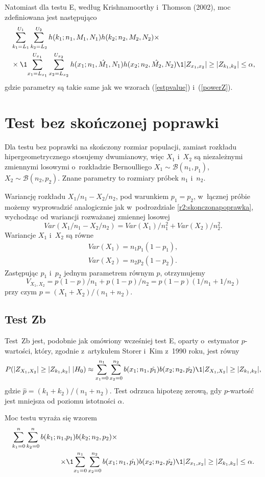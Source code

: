 Natomiast dla testu E, według Krishnamoorthy i~Thomson (2002), moc zdefiniowana jest następująco \cite{K.Krishnamoorthy2002}
\begin{equation}
\begin{split}
&\sum_{k_1=L_1}^{U_1}\sum_{k_2=L_2}^{U_2} h(k_1;n_1,M_1,N_1)h(k_2;n_2,M_2,N_2) \times \\
&\times \1{\sum_{x_1=L_{x_1}}^{U_{x_1}}\sum_{x_2=L_{x_2}}^{U_{x_2}} h(x_1;n_1,\hat{M_1},N_1)h(x_2;n_2,\hat{M_2},N_2) \1{|Z_{x_1,x_2}|\geq|Z_{k_1,k_2}|}\leq\alpha },
\end{split}
\end{equation}
gdzie parametry są takie same jak we wzorach (\ref{estpvalue}) i~(\ref{powerZ}).

\section{Test bez skończonej poprawki}
Dla testu bez poprawki na skończony rozmiar populacji, zamiast rozkładu hipergeometrycznego stosujemy dwumianowy, więc $X_1$ i~$X_2$ są niezależnymi zmiennymi losowymi o~rozkładzie Bernoulliego $X_1\sim \mathcal{B}(n_1,p_1)$, $X_2\sim \mathcal{B}(n_2,p_2)$. Znane parametry to rozmiary próbek $n_1$ i~$n_2$.

Wariancję rozkładu $X_1/n_1-X_2/n_2$, pod warunkiem $p_1=p_2$, w~łącznej próbie możemy wyprowadzić analogicznie jak w~podrozdziale \ref{r2:skonczonapoprawka}, wychodząc od wariancji rozważanej zmiennej losowej
\begin{equation}
Var(X_1/n_1-X_2/n_2) = Var(X_1)/n_1^2+Var(X_2)/n_2^2.
\end{equation}
Wariancje $X_1$ i~$X_2$ są równe
\begin{align}
Var(X_1)=n_1 p_1 (1-p_1),\\
Var(X_2)=n_2 p_2 (1-p_2).
\end{align}
Zastępując $p_1$ i~$p_2$ jednym parametrem równym $p$, otrzymujemy
\begin{equation}
V_{X_1,X_2} = p(1-p)/n_1 + p(1-p)/n_2 = p(1-p)(1/n_1+1/n_2)
\end{equation}
przy czym $p=(X_1+X_2)/(n_1+n_2)$.

\subsection{Test Zb}

Test~Zb jest, podobnie jak omówiony wcześniej test E, oparty o~estymator $p$-wartości, który, zgodnie z~artykułem Storer i~Kim z~1990 roku, jest równy \cite{Storer1990}
\begin{equation}
P(|Z_{X_1,X_2}|\geq|Z_{k_1,k_2}|\ |H_0) \approx \sum_{x_1=0}^{n_1}\sum_{x_2=0}^{n_2} b(x_1;n_1,\hat{p_1})b(x_2;n_2,\hat{p_2})\1{|Z_{X_1,X_2}|\geq|Z_{k_1,k_2}|},
\end{equation}
gdzie $\hat{p}=(k_1+k_2)/(n_1+n_2)$.
Test odrzuca hipotezę zerową, gdy $p$-wartość jest mniejsza od poziomu istotności $\alpha$.

Moc testu wyraża się wzorem
\begin{equation}
\begin{split}
\sum_{k_1=0}^{n}\sum_{k_2=0}^{n} b(k_1;n_1,&p_1)b(k_2;n_2,p_2) \times \\
\times &\1{\sum_{x_1=0}^{n_1} \sum_{x_2=0}^{n_2} b(x_1;n_1,\hat{p_1}) b(x_2;n_2,\hat{p_2}) \1{|Z_{x_1,x_2}|\geq|Z_{k_1,k_2}|} \leq\alpha}.
\end{split}
\end{equation}

